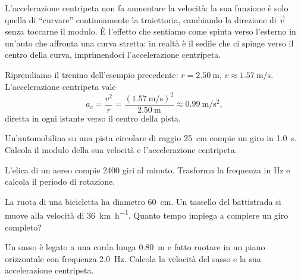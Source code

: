 \begin{remark}
L'accelerazione centripeta non fa aumentare la velocità: la sua funzione è solo quella di ``curvare'' continuamente la traiettoria, cambiando la direzione di $\vec v$ senza toccarne il modulo. È l'effetto che sentiamo come spinta verso l'esterno in un'auto che affronta una curva stretta: in realtà è il sedile che ci spinge verso il centro della curva, imprimendoci l'accelerazione centripeta.
\end{remark}

\begin{testexample}
Riprendiamo il trenino dell'esempio precedente: $r = \SI{2,50}{\metre}$, $v \approx \SI{1,57}{\metre\per\second}$. L'accelerazione centripeta vale
\[ a_c = \frac{v^2}{r} = \frac{(\SI{1,57}{\metre\per\second})^2}{\SI{2,50}{\metre}} \approx \SI{0,99}{\metre\per\second\squared}, \]
diretta in ogni istante verso il centro della pista.
\end{testexample}

\begin{esercizio}
Un'automobilina su una pista circolare di raggio \SI{25}{\centi\metre} compie un giro in \SI{1,0}{\second}. Calcola il modulo della sua velocità e l'accelerazione centripeta.\\
\end{esercizio}

\begin{esercizio}
L'elica di un aereo compie \SI{2400}{} giri al minuto. Trasforma la frequenza in \si{\hertz} e calcola il periodo di rotazione.\\
\end{esercizio}

\begin{esercizio}
La ruota di una bicicletta ha diametro \SI{60}{\centi\metre}. Un tassello del battistrada si muove alla velocità di \SI{36}{\kilo\metre\per\hour}. Quanto tempo impiega a compiere un giro completo?\\
\end{esercizio}

\begin{esercizio}
Un sasso è legato a una corda lunga \SI{0,80}{\metre} e fatto ruotare in un piano orizzontale con frequenza \SI{2,0}{\hertz}. Calcola la velocità del sasso e la sua accelerazione centripeta.\\
\end{esercizio}

